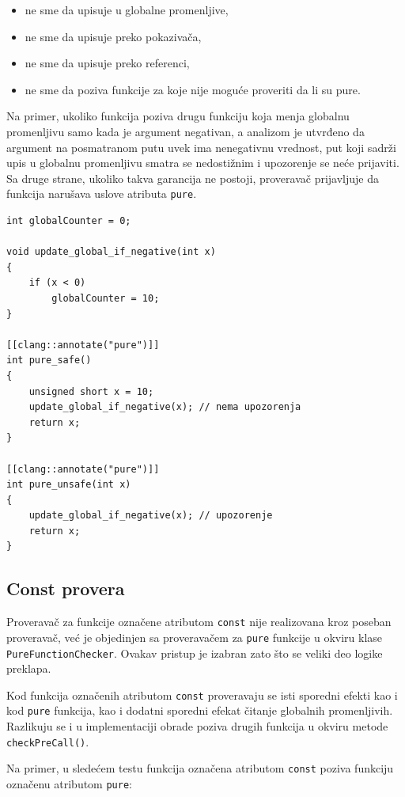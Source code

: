 \documentclass[a4paper,12pt]{article}
\begin{document}
\begin{itemize}
    \item ne sme da upisuje u globalne promenljive,
    \item ne sme da upisuje preko pokazivača,
    \item ne sme da upisuje preko referenci,
    \item ne sme da poziva funkcije za koje nije moguće proveriti da li su pure.
\end{itemize}

Na primer, ukoliko funkcija poziva drugu funkciju koja menja globalnu promenljivu samo kada je argument negativan, 
a analizom je utvrđeno da argument na posmatranom putu uvek ima nenegativnu vrednost, 
put koji sadrži upis u globalnu promenljivu smatra se nedostižnim i upozorenje se neće prijaviti. 
Sa druge strane, ukoliko takva garancija ne postoji, proveravač prijavljuje da funkcija narušava uslove atributa \texttt{pure}.

\begin{lstlisting}[caption={Path-sensitive analiza},label={lst:path-sensitive}]
int globalCounter = 0;

void update_global_if_negative(int x)
{
    if (x < 0)
        globalCounter = 10;
}

[[clang::annotate("pure")]]
int pure_safe()
{
    unsigned short x = 10;
    update_global_if_negative(x); // nema upozorenja
    return x;
}

[[clang::annotate("pure")]]
int pure_unsafe(int x)
{
    update_global_if_negative(x); // upozorenje
    return x;
}
\end{lstlisting}

\subsection{Const provera}

Proveravač za funkcije označene atributom \texttt{const} nije realizovana kroz poseban proveravač, već je objedinjen sa proveravačem za \texttt{pure} funkcije u okviru klase \texttt{PureFunctionChecker}. 
Ovakav pristup je izabran zato što se veliki deo logike preklapa.

Kod funkcija označenih atributom \texttt{const} proveravaju se isti sporedni efekti kao i kod \texttt{pure} funkcija, kao i dodatni sporedni efekat čitanje globalnih promenljivih. Razlikuju se i u implementaciji obrade poziva drugih funkcija u okviru metode \texttt{checkPreCall()}.


Na primer, u sledećem testu funkcija označena atributom \texttt{const} poziva funkciju označenu atributom \texttt{pure}:
\end{document}
